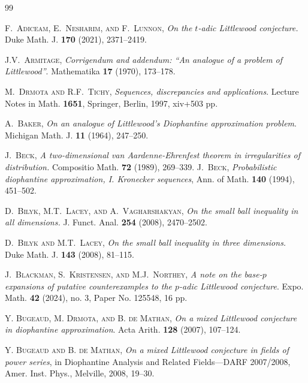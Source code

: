 \documentclass{article}
\renewcommand{\(}{\left (}
\renewcommand{\)}{\right )}
\theoremstyle{definition}
\numberwithin{equation}{section}
\begin{document}
\begin{thebibliography}{99}

 \textsc{F.~Adiceam, E.~Nesharim, and F.~Lunnon},
\textit{On the $t$-adic Littlewood conjecture.} 
{Duke Math. J.} {\bf170} (2021), 2371--2419.


\textsc{J.V.~Armitage}, \textit{Corrigendum and addendum: ``An analogue of a problem of Littlewood''}.
Mathematika {\bf17} (1970), 173--178.




 \textsc{M.~Drmota and R.F.~Tichy}, \textit{Sequences, discrepancies and applications}. 
Lecture Notes in Math. {\bf1651},
Springer, Berlin, 1997, xiv+503 pp.


 \textsc{A.~Baker}, \textit{On an analogue of Littlewood's Diophantine approximation problem}. Michigan Math. J. {\bf11} (1964), 247--250. 

 \textsc{J.~Beck}, \textit{A two-dimensional van Aardenne-Ehrenfest theorem in irregularities of distribution.} {Compositio Math.} {\bf72} (1989), 269--339.
\textsc{J.~Beck}, \textit{Probabilistic diophantine approximation, I. Kronecker sequences},
Ann. of Math. {\bf140} (1994), 451--502. 


 \textsc{D.~Bilyk, M.T.~Lacey, and A.~Vagharshakyan}, \textit{On the small ball inequality in all dimensions.} {J. Funct. Anal.} {\bf254} (2008), 2470--2502.

 \textsc{D.~Bilyk and M.T.~Lacey}, \textit{On the small ball inequality in three dimensions.} {Duke Math. J.} {\bf143} (2008), 81--115.

 \textsc{J.~Blackman, S.~Kristensen, and M.J.~Northey}, \textit{A note on the base-$p$ expansions of putative counterexamples to the $p$-adic Littlewood conjecture}.
Expo. Math. {\bf42} (2024), no. 3, Paper No. 125548, 16 pp.

 \textsc{Y. Bugeaud, M. Drmota, and B. de Mathan}, \textit{On a mixed Littlewood conjecture in diophantine approximation}. Acta Arith. {\bf128} (2007), 107--124. 

 \textsc{Y. Bugeaud and B. de Mathan}, \textit{On a mixed Littlewood conjecture in fields of power series}, in Diophantine Analysis and Related Fields—DARF 2007/2008, Amer. Inst. Phys., Melville, 2008, 19--30. 


\end{thebibliography}
\end{document}

